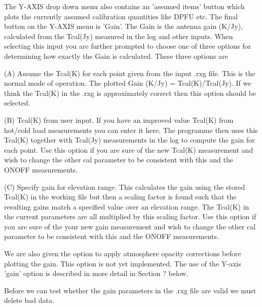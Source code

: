    The Y-AXIS drop down menu  also contains an  'assumed items' 
   button which plots the currently assumed calibration quantities like 
   DPFU etc. The final button on the Y-AXIS menu is 'Gain'. The 
   Gain is the antenna gain (K/Jy), calculated from the
   Tcal(Jy) measured in the log and other inputs. When selecting 
   this input you are further prompted to choose one of three options
   for determining how exactly the Gain is calculated. These three 
   options are

\vskip 0.5cm
 

\noindent (A) Assume the Tcal(K) for each point given from the 
   input .rxg file. This is the normal mode of operation.
   The plotted  Gain (K/Jy)  = Tcal(K)/Tcal(Jy).
   If we think the Tcal(K) in the .rxg is approximately correct 
   then this option should be selected.

\vskip 0.5cm

\noindent   (B) Tcal(K)  from user input. If you have an improved 
    value Tcal(K) from hot/cold load measurements  you can enter 
    it here. The programme then uses this Tcal(K) together 
    with Tcal(Jy) measurements in the log to compute the gain for each point.
    Use this option if you are sure of the new Tcal(K) measurement 
    and wish to change the other cal parameter to be consistent with this 
    and the  ONOFF measurements.

\vskip 0.5cm

\noindent   (C) Specify gain for elevation range. This calculates the 
    gain using the stored Tcal(K) in the working file but 
    then a scaling factor is found such that the resulting gains 
    match a specified value over an elevation range. The 
    Tcal(K) in the current parameters are all multiplied 
    by this scaling factor. Use this option if you are sure of the 
    your new gain  measurement  and wish to change the other cal 
    parameter to be consistent with this  and the  ONOFF measurements.

\vskip 0.5cm
 
    We are also given the option to apply atmosphere 
    opacity corrections before plotting the gain. This 
    option is not yet implemented. The use of the Y-axis 
    'gain' option is described in more detail 
    in Section ?  below.

\vskip 1cm


\vskip 0.5cm

    Before we can test whether the gain parameters in 
    the .rxg file are valid we must delete 
    bad data. 

